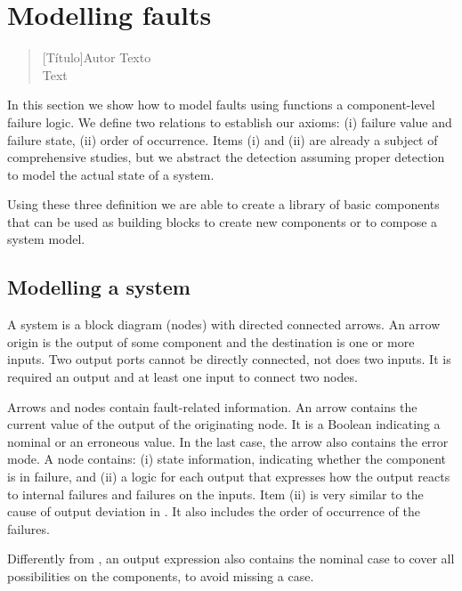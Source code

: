 \chapter{Modelling faults}
\label{sec:fault-modelling}

\begin{quotation}[Título]{Autor}
Texto \\
Text
\end{quotation}

In this section we show how to model faults using functions a component-level failure logic.
%
We define two relations to establish our axioms: (i) failure value and failure state, (ii) order of occurrence.
%
Items (i) and (ii) are already a subject of comprehensive studies, but we abstract the detection assuming proper detection to model the actual state of a system.

Using these three definition we are able to create a library of basic components that can be used as building blocks to create new components or to compose a system model.

\section{Modelling a system}
\label{sec:modelling-a-system}

A system is a block diagram (nodes) with directed connected arrows. 
%
An arrow origin is the output of some component and the destination is one or more inputs.
%
Two output ports cannot be directly connected, not does two inputs.
%
It is required an output and at least one input to connect two nodes.

Arrows and nodes contain fault-related information.
%
An arrow contains the current value of the output of the originating node.
%
It is a Boolean indicating a nominal or an erroneous value. 
%
In the last case, the arrow also contains the error mode.
%
A node contains: (i) state information, indicating whether the component is in failure, and (ii) a logic for each output that expresses how the output reacts to internal failures and failures on the inputs. 
%
Item (ii) is very similar to the cause of output deviation in \HIPHOPS.
%
It also includes the order of occurrence of the failures.

Differently from \HIPHOPS, an output expression also contains the nominal case to cover all possibilities on the components, to avoid missing a case.

